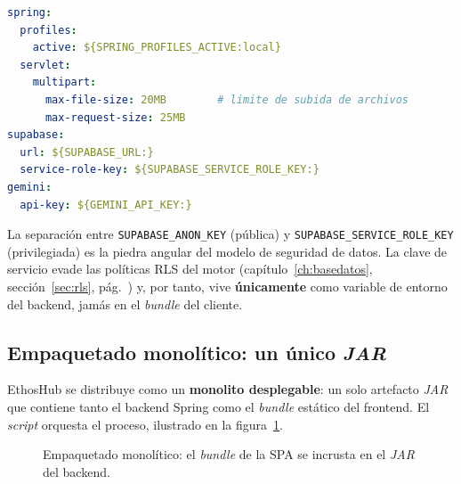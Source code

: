 \begin{lstlisting}[language=yaml, caption={Extracto de configuración externalizada (\texttt{application.yml}).}, label={lst:appyml}]
spring:
  profiles:
    active: ${SPRING_PROFILES_ACTIVE:local}
  servlet:
    multipart:
      max-file-size: 20MB        # limite de subida de archivos
      max-request-size: 25MB
supabase:
  url: ${SUPABASE_URL:}
  service-role-key: ${SUPABASE_SERVICE_ROLE_KEY:}
gemini:
  api-key: ${GEMINI_API_KEY:}
\end{lstlisting}

\begin{AlertaSeguridad}
La separación entre \texttt{SUPABASE\_ANON\_KEY} (pública) y
\texttt{SUPABASE\_SERVICE\_ROLE\_KEY} (privilegiada) es la piedra angular del modelo de
seguridad de datos. La clave de servicio evade las políticas RLS del motor
(capítulo~\ref{ch:basedatos}, sección~\ref{sec:rls}, pág.~\pageref{sec:rls}) y, por tanto,
vive \textbf{únicamente} como variable de entorno del backend, jamás en el \textit{bundle}
del cliente.
\end{AlertaSeguridad}

\subsection{Empaquetado monolítico: un único \textit{JAR}}
\label{subsec:empaquetado}

EthosHub se distribuye como un \textbf{monolito desplegable}: un solo artefacto \textit{JAR}
que contiene tanto el backend Spring como el \textit{bundle} estático del frontend. El
\textit{script}  orquesta el proceso, ilustrado en la
figura~\ref{fig:build-monolito}.

\vspace{0.3cm}
\begin{figure}[h!]
\centering
{}
\caption{Empaquetado monolítico: el \textit{bundle} de la SPA se incrusta en el \textit{JAR} del backend.}
\label{fig:build-monolito}
\end{figure}

